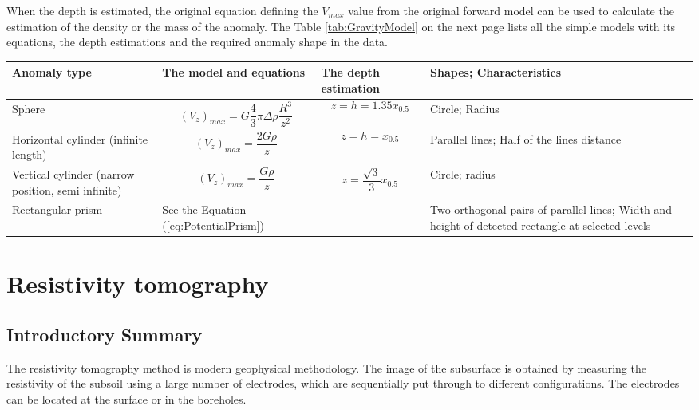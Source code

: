 \documentclass[FM]{tulthesis}
\begin{document}
When the depth is estimated, the original equation defining the $V_{max}$ value from the original forward model can be used to calculate the estimation of the density or the mass of the anomaly. The Table \ref{tab:GravityModel} on the next page lists all the simple models with its equations, the depth estimations and the required anomaly shape in the data.


\begin{sidewaystable}
\renewcommand{\arraystretch}{1.2}
\begin{tabular}{|p{5cm}|p{5cm}|p{5cm}|p{5cm}|}
\hline
\textbf{Anomaly type}&\textbf{The model and equations}&\textbf{The depth estimation}& \textbf{Shapes; Characteristics}\footnotemark \\ \hline \hline
Sphere & $$(V_{z})_{max} = G\frac{4}{3}\pi\Delta\rho\frac{R^{3}}{z^{2}}$$ & $$z = h = 1.35x_{0.5}$$ & Circle; Radius\\ \hline
Horizontal cylinder (infinite length) & $$(V_{z})_{max} = \frac{2G\rho}{z}$$ & $$z = h = x_{0.5}$$ & Parallel lines; Half of the lines distance\\ \hline
Vertical cylinder (narrow position, semi infinite) & $$(V_{z})_{max} = \frac{G\rho}{z}$$ & $$z = \frac{\sqrt{3}}{3}x_{0.5}$$ & Circle; radius \\ \hline
Rectangular prism & See the Equation (\ref{eq:PotentialPrism}) & &Two orthogonal pairs of parallel lines; Width and height of detected rectangle at selected levels\\ \hline
\end{tabular}
\renewcommand{\tablename}{Table}
\caption[The gravity anomaly analytical models]{The gravity anomaly analytical models}
\label{tab:GravityModel}
\end{sidewaystable}


\section{Resistivity tomography}
\subsection{Introductory Summary}
The resistivity tomography method is modern geophysical methodology. The image of the subsurface is obtained by measuring the resistivity of the subsoil using a large number of electrodes, which are sequentially put through to different configurations. The electrodes can be located at the surface or in the boreholes. 
\end{document}
